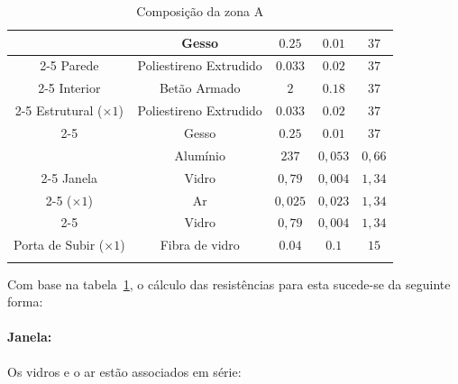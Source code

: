 \documentclass[12pt, a4paper]{article}
\begin{document}
\begin{table}[htpb]
\begin{center}
\begin{tabular}{c c c c c}
			\multirow{5}{*}{}          & Gesso                  & $0.25$                            & $0.01$                       & $37$          \\
				\cline{2-5}
			Parede                     & Poliestireno Extrudido & $0.033$                           & $0.02$                       & $37$          \\
				\cline{2-5}
			Interior                   & Betão Armado           & $2$                               & $0.18$                       & $37$          \\
				\cline{2-5}
			Estrutural ($\times 1$)    & Poliestireno Extrudido & $0.033$                           & $0.02$                       & $37$          \\
				\cline{2-5}
			                           & Gesso                  & $0.25$                            & $0.01$                       & $37$          \\
				\midrule{}

			\multirow{5}{*}{}		   & Alumínio 				& $237$                            	& $0,053$                      & $0,66$		   \\
				\cline{2-5}
			Janela    				   & Vidro    				& $0,79$                           	& $0,004$                      & $1,34$		   \\
				\cline{2-5}
			($\times 1$)			   & Ar       				& $0,025$                          	& $0,023$                      & $1,34$		   \\
				\cline{2-5}
									   & Vidro    				& $0,79$                           	& $0,004$                      & $1,34$		   \\
				\midrule{}
			Porta de Subir ($\times 1$) & Fibra de vidro        & $0.04$                            & $0.1$                        & $15$           \\
			\bottomrule{}
		\end{tabular}
	\end{center}
	\caption{Composição da zona A}\label{tab:zona_a}
\end{table}

Com base na tabela~\ref*{tab:zona_a}, o cálculo das resistências para esta sucede-se da seguinte forma:

\paragraph{Janela:}\label{par:zona_a_janela}Os vidros e o ar estão associados em série:
\end{document}

